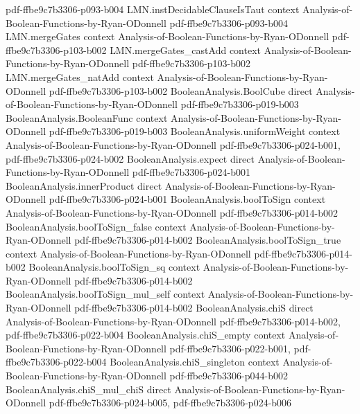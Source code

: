 \begin{lemma}
  {pdf-ffbe9c7b3306-p093-b004}
\proofstep
  {LMN.instDecidableClauseIsTaut}
  {context}
  {Analysis-of-Boolean-Functions-by-Ryan-ODonnell}
  {pdf-ffbe9c7b3306-p093-b004}
\proofstep
  {LMN.mergeGates}
  {context}
  {Analysis-of-Boolean-Functions-by-Ryan-ODonnell}
  {pdf-ffbe9c7b3306-p103-b002}
\proofstep
  {LMN.mergeGates_castAdd}
  {context}
  {Analysis-of-Boolean-Functions-by-Ryan-ODonnell}
  {pdf-ffbe9c7b3306-p103-b002}
\proofstep
  {LMN.mergeGates_natAdd}
  {context}
  {Analysis-of-Boolean-Functions-by-Ryan-ODonnell}
  {pdf-ffbe9c7b3306-p103-b002}
\proofstep
  {BooleanAnalysis.BoolCube}
  {direct}
  {Analysis-of-Boolean-Functions-by-Ryan-ODonnell}
  {pdf-ffbe9c7b3306-p019-b003}
\proofstep
  {BooleanAnalysis.BooleanFunc}
  {context}
  {Analysis-of-Boolean-Functions-by-Ryan-ODonnell}
  {pdf-ffbe9c7b3306-p019-b003}
\proofstep
  {BooleanAnalysis.uniformWeight}
  {context}
  {Analysis-of-Boolean-Functions-by-Ryan-ODonnell}
  {pdf-ffbe9c7b3306-p024-b001,
    pdf-ffbe9c7b3306-p024-b002}
\proofstep
  {BooleanAnalysis.expect}
  {direct}
  {Analysis-of-Boolean-Functions-by-Ryan-ODonnell}
  {pdf-ffbe9c7b3306-p024-b001}
\proofstep
  {BooleanAnalysis.innerProduct}
  {direct}
  {Analysis-of-Boolean-Functions-by-Ryan-ODonnell}
  {pdf-ffbe9c7b3306-p024-b001}
\proofstep
  {BooleanAnalysis.boolToSign}
  {context}
  {Analysis-of-Boolean-Functions-by-Ryan-ODonnell}
  {pdf-ffbe9c7b3306-p014-b002}
\proofstep
  {BooleanAnalysis.boolToSign_false}
  {context}
  {Analysis-of-Boolean-Functions-by-Ryan-ODonnell}
  {pdf-ffbe9c7b3306-p014-b002}
\proofstep
  {BooleanAnalysis.boolToSign_true}
  {context}
  {Analysis-of-Boolean-Functions-by-Ryan-ODonnell}
  {pdf-ffbe9c7b3306-p014-b002}
\proofstep
  {BooleanAnalysis.boolToSign_sq}
  {context}
  {Analysis-of-Boolean-Functions-by-Ryan-ODonnell}
  {pdf-ffbe9c7b3306-p014-b002}
\proofstep
  {BooleanAnalysis.boolToSign_mul_self}
  {context}
  {Analysis-of-Boolean-Functions-by-Ryan-ODonnell}
  {pdf-ffbe9c7b3306-p014-b002}
\proofstep
  {BooleanAnalysis.chiS}
  {direct}
  {Analysis-of-Boolean-Functions-by-Ryan-ODonnell}
  {pdf-ffbe9c7b3306-p014-b002,
    pdf-ffbe9c7b3306-p022-b004}
\proofstep
  {BooleanAnalysis.chiS_empty}
  {context}
  {Analysis-of-Boolean-Functions-by-Ryan-ODonnell}
  {pdf-ffbe9c7b3306-p022-b001,
    pdf-ffbe9c7b3306-p022-b004}
\proofstep
  {BooleanAnalysis.chiS_singleton}
  {context}
  {Analysis-of-Boolean-Functions-by-Ryan-ODonnell}
  {pdf-ffbe9c7b3306-p044-b002}
\proofstep
  {BooleanAnalysis.chiS_mul_chiS}
  {direct}
  {Analysis-of-Boolean-Functions-by-Ryan-ODonnell}
  {pdf-ffbe9c7b3306-p024-b005,
    pdf-ffbe9c7b3306-p024-b006}

\end{lemma}
